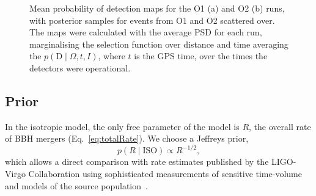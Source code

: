 \documentclass[usenatbib,useAMS]{mnras}
\begin{document}
% 
\begin{figure}
	\centering
	\hfill
%    
    \caption{Mean probability of detection maps for the O1 (a) and O2 (b) runs, with
    posterior samples for events from O1 and O2 scattered over. The maps were
    calculated with the average \ac{PSD} for each run, marginalising the
    selection function over distance and time averaging the
    $p\left(\bm{\mathrm{D}} \mid \Omega, t, I\right)$, where $t$ is the GPS
    time, over the times the detectors were operational.}
\label{fig:meanPofd} 
\end{figure}

\subsection{Prior}\label{subsec:prior}
% 
In the isotropic model, the only free parameter of the model is $R$, the overall
rate of \ac{BBH} mergers (Eq.~\ref{eq:totalRate}). We choose a Jeffreys prior,
% 
\begin{equation}\label{eq:prioriso}
    p\left(R \mid \mathrm{ISO}\right) \propto R^{-1/2},
\end{equation}
% 
which allows a direct comparison with rate estimates published by the LIGO-Virgo
Collaboration using sophisticated measurements of sensitive time-volume and
models of the source population~\citep{O2populations}.
\end{document}
